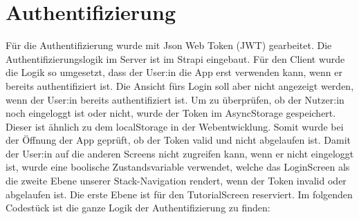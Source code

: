 \section{Authentifizierung}
Für die Authentifizierung wurde mit Json Web Token (JWT) gearbeitet. Die Authentifizierungslogik im Server ist im Strapi eingebaut. Für den Client wurde die Logik so umgesetzt, dass der User:in die App erst verwenden kann, wenn er bereits authentifiziert ist.
Die Ansicht fürs Login soll aber nicht angezeigt werden, wenn der User:in bereits authentifiziert ist.
Um zu überprüfen, ob der Nutzer:in noch eingeloggt ist oder nicht, wurde der Token im AsyncStorage gespeichert. Dieser ist ähnlich zu dem localStorage in der Webentwicklung. Somit wurde bei der Öffnung der App geprüft, ob der Token valid und nicht abgelaufen ist.
Damit der User:in auf die anderen Screens nicht zugreifen kann, wenn er nicht eingeloggt ist, wurde eine boolische Zustandsvariable verwendet, welche das LoginScreen als die zweite Ebene unserer Stack-Navigation rendert, wenn der Token invalid oder abgelaufen ist. Die erste Ebene ist für den TutorialScreen reserviert.
Im folgenden Codestück ist die ganze Logik der Authentifizierung zu finden:
